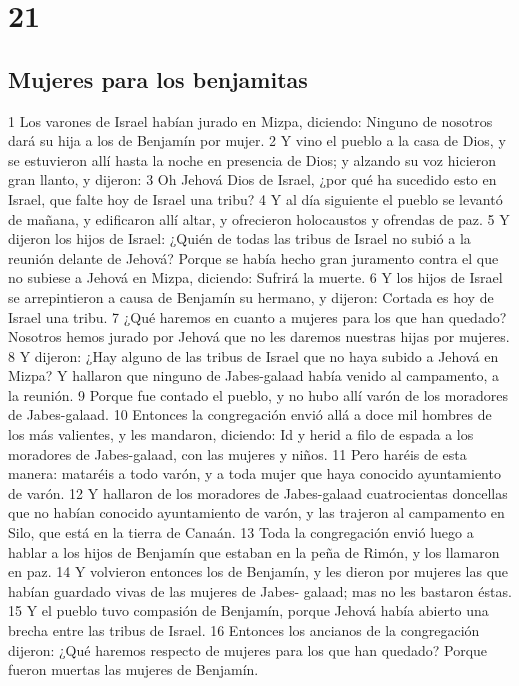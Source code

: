 \chapter{21}

\section*{Mujeres para los benjamitas}

1 Los varones de Israel habían jurado en Mizpa, diciendo: Ninguno de nosotros dará su hija a los de Benjamín por mujer.
2 Y vino el pueblo a la casa de Dios, y se estuvieron allí hasta la noche en presencia de Dios; y alzando su voz hicieron gran llanto, y dijeron:
3 Oh Jehová Dios de Israel, ¿por qué ha sucedido esto en Israel, que falte hoy de Israel una tribu?
4 Y al día siguiente el pueblo se levantó de mañana, y edificaron allí altar, y ofrecieron holocaustos y ofrendas de paz.
5 Y dijeron los hijos de Israel: ¿Quién de todas las tribus de Israel no subió a la reunión delante de Jehová? Porque se había hecho gran juramento contra el que no subiese a Jehová en Mizpa, diciendo: Sufrirá la muerte.
6 Y los hijos de Israel se arrepintieron a causa de Benjamín su hermano, y dijeron: Cortada es hoy de Israel una tribu.
7 ¿Qué haremos en cuanto a mujeres para los que han quedado? Nosotros hemos jurado por Jehová que no les daremos nuestras hijas por mujeres.
8 Y dijeron: ¿Hay alguno de las tribus de Israel que no haya subido a Jehová en Mizpa? Y hallaron que ninguno de Jabes-galaad había venido al campamento, a la reunión.
9 Porque fue contado el pueblo, y no hubo allí varón de los moradores de Jabes-galaad. 
10 Entonces la congregación envió allá a doce mil hombres de los más valientes, y les mandaron, diciendo: Id y herid a filo de espada a los moradores de Jabes-galaad, con las mujeres y niños.
11 Pero haréis de esta manera: mataréis a todo varón, y a toda mujer que haya conocido ayuntamiento de varón.
12 Y hallaron de los moradores de Jabes-galaad cuatrocientas doncellas que no habían conocido ayuntamiento de varón, y las trajeron al campamento en Silo, que está en la tierra de Canaán.
13 Toda la congregación envió luego a hablar a los hijos de Benjamín que estaban en la peña de Rimón, y los llamaron en paz.
14 Y volvieron entonces los de Benjamín, y les dieron por mujeres las que habían guardado vivas de las mujeres de Jabes- galaad; mas no les bastaron éstas.
15 Y el pueblo tuvo compasión de Benjamín, porque Jehová había abierto una brecha entre las tribus de Israel.
16 Entonces los ancianos de la congregación dijeron: ¿Qué haremos respecto de mujeres para los que han quedado? Porque fueron muertas las mujeres de Benjamín.

